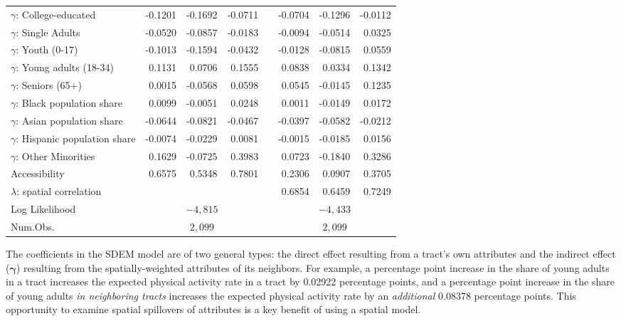 \documentclass[Crown,sageh.bst]{sagej}
\begin{document}
\begin{table*}
\begin{tabular}{l d{2.4} d{2.4} d{2.4} c d{2.4} d{2.4} d{2.4} }
  $\gamma$: College-educated & -0.1201 & -0.1692 & -0.0711 &   & -0.0704 & -0.1296 & -0.0112 \\ 
  $\gamma$: Single Adults & -0.0520 & -0.0857 & -0.0183 &   & -0.0094 & -0.0514 & 0.0325 \\ 
  $\gamma$: Youth (0-17) & -0.1013 & -0.1594 & -0.0432 &   & -0.0128 & -0.0815 & 0.0559 \\ 
  $\gamma$: Young adults (18-34) & 0.1131 & 0.0706 & 0.1555 &   & 0.0838 & 0.0334 & 0.1342 \\ 
  $\gamma$: Seniors (65+) & 0.0015 & -0.0568 & 0.0598 &   & 0.0545 & -0.0145 & 0.1235 \\ 
  $\gamma$: Black population share & 0.0099 & -0.0051 & 0.0248 &   & 0.0011 & -0.0149 & 0.0172 \\ 
  $\gamma$: Asian population share & -0.0644 & -0.0821 & -0.0467 &   & -0.0397 & -0.0582 & -0.0212 \\ 
  $\gamma$: Hispanic population share & -0.0074 & -0.0229 & 0.0081 &   & -0.0015 & -0.0185 & 0.0156 \\ 
  $\gamma$: Other Minorities & 0.1629 & -0.0725 & 0.3983 &   & 0.0723 & -0.1840 & 0.3286 \\ 
  Accessibility & 0.6575 & 0.5348 & 0.7801 &   & 0.2306 & 0.0907 & 0.3705 \\ 
  $\lambda$: spatial correlation &  &  &  &   & 0.6854 & 0.6459 & 0.7249 \\ 
  
\midrule
Log Likelihood &  & & \\
Num.Obs.       &    & & \\
\bottomrule
\end{tabular}
\end{table*}

The coefficients in the SDEM model are of two general types: the direct
effect resulting from a tract's own attributes and the indirect effect
(\(\boldsymbol{\gamma}\)) resulting from the spatially-weighted
attributes of its neighbors. For example, a percentage point increase in
the share of young adults in a tract increases the expected physical
activity rate in a tract by 0.02922 percentage points, and a percentage
point increase in the share of young adults \emph{in neighboring tracts}
increases the expected physical activity rate by an \emph{additional}
0.08378 percentage points. This opportunity to examine spatial
spillovers of attributes is a key benefit of using a spatial model.
\end{document}
